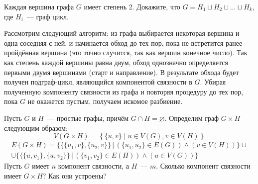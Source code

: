 \begin{Exercise}[counter=SecExercise]
    \noindent
    Каждая вершина графа $ G $ имеет степень 2.
    Докажите, что $ G = H_1 \sqcup H_2 \sqcup \ldots \sqcup H_k $, где $ H_i $~--- граф цикл.
\end{Exercise}

\begin{Answer}
    \noindent
    Рассмотрим следующий алгоритм:
    из графа выбирается некоторая вершина и одна соседняя с ней,
    и начинается обход до тех пор, пока не встретится ранее пройдённая вершина
    (это точно случится, так как вершин конечное число).
    Так как степень каждой вершины равна двум, обход однозначно определяется первыми двумя вершинами (старт и направление).
    В результате обхода будет получен подграф-цикл, являющийся компонентой связности в $ G $.
    Убирая полученную компоненту связности из графа и повторяя процедуру до тех пор, пока $ G $ не окажется пустым,
    получаем искомое разбиение.
\end{Answer}


\begin{Exercise}[counter=SecExercise]
    \noindent
    Пусть $ G $ и $ H $~--- простые графы, причём $ G \cap H = \varnothing $.
    Определим граф $ G \times H $ следующим образом:
    \[
        V(G \times H) = \left\{ \{u, v\} \mid u \in V(G), v \in V(H) \right\}
    \]
    \begin{multline*}
        E(G \times H) = \Big\{ \big\{ \{u_1, v \}, \{u_2, v \} \big\} \, \Big| \, \left( \{u_1, u_2\} \in E(G) \right) \wedge \left( v \in V(H) \right) \Big\} \cup \\
        \cup \Big\{ \big\{ \{u, v_1 \}, \{u, v_2 \} \big\} \, \Big| \, \left( \{v_1, v_2\} \in E(H) \right) \wedge \left( u \in V(G) \right) \Big\}
    \end{multline*}
    Пусть $ G $ имеет $ n $ компонент связности, а $ H $~--- $ m $.
    Сколько компонент связности имеет $ G \times H $?
    Как они устроены?
\end{Exercise}

